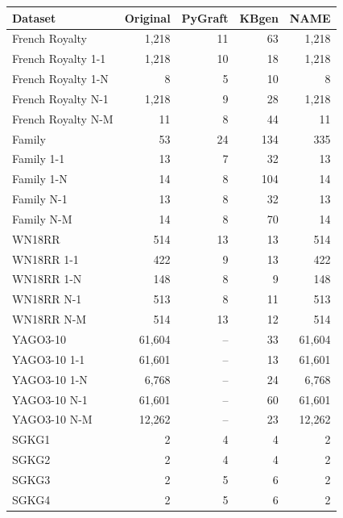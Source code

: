 \begin{tabular}{lrrrr}
\toprule
Dataset & Original & PyGraft & KBgen & NAME \\
\midrule
French Royalty & 1{,}218 & 11 & 63 & 1{,}218 \\
French Royalty 1-1 & 1{,}218 & 10 & 18 & 1{,}218 \\
French Royalty 1-N & 8 & 5 & 10 & 8 \\
French Royalty N-1 & 1{,}218 & 9 & 28 & 1{,}218 \\
French Royalty N-M & 11 & 8 & 44 & 11 \\
\midrule
Family & 53 & 24 & 134 & 335 \\
Family 1-1 & 13 & 7 & 32 & 13 \\
Family 1-N & 14 & 8 & 104 & 14 \\
Family N-1 & 13 & 8 & 32 & 13 \\
Family N-M & 14 & 8 & 70 & 14 \\
\midrule
WN18RR & 514 & 13 & 13 & 514 \\
WN18RR 1-1 & 422 & 9 & 13 & 422 \\
WN18RR 1-N & 148 & 8 & 9 & 148 \\
WN18RR N-1 & 513 & 8 & 11 & 513 \\
WN18RR N-M & 514 & 13 & 12 & 514 \\
\midrule
YAGO3-10 & 61{,}604 & – & 33 & 61{,}604 \\
YAGO3-10 1-1 & 61{,}601 & – & 13 & 61{,}601 \\
YAGO3-10 1-N & 6{,}768 & – & 24 & 6{,}768 \\
YAGO3-10 N-1 & 61{,}601 & – & 60 & 61{,}601 \\
YAGO3-10 N-M & 12{,}262 & – & 23 & 12{,}262 \\
\midrule
SGKG1 & 2 & 4 & 4 & 2 \\
SGKG2 & 2 & 4 & 4 & 2 \\
SGKG3 & 2 & 5 & 6 & 2 \\
SGKG4 & 2 & 5 & 6 & 2 \\
\bottomrule
\end{tabular}
